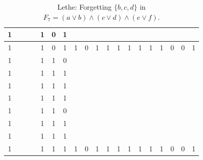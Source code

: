 \begin{table}[!tb]
\begin{tabular}{|c|c|c|c|c|c|c|c|c|c|c|c|c|c|c|c|c|c|c|}
        \rowcolor{blue!40} 1 &  &  &  & 1 & 0 & 1 &  &  &  &  &  &  &  &  &  &  &  &  \\ \hline
        \rowcolor{blue!40} 1 &  &  &  & 1 & 0 & 1 & 1 & 0 & 1 & 1 & 1 & 1 & 1 & 1 & 1 & 0 & 0 & 1 \\ \hline
        \rowcolor{red!40} 1 &  &  &  & 1 & 1 & 0 &  &  &  &  &  &  &  &  &  &  &  &  \\ \hline
        \rowcolor{red!40} 1 &  &  &  & 1 & 1 & 1 &  &  &  &  &  &  &  &  &  &  &  &  \\ \hline
        \rowcolor{red!40} 1 &  &  &  & 1 & 1 & 1 &  &  &  &  &  &  &  &  &  &  &  &  \\ \hline
        \rowcolor{red!40} 1 &  &  &  & 1 & 1 & 1 &  &  &  &  &  &  &  &  &  &  &  &  \\ \hline
        \rowcolor{red!40} 1 &  &  &  & 1 & 1 & 0 &  &  &  &  &  &  &  &  &  &  &  &  \\ \hline
        \rowcolor{red!40} 1 &  &  &  & 1 & 1 & 1 &  &  &  &  &  &  &  &  &  &  &  &  \\ \hline
        \rowcolor{red!40} 1 &  &  &  & 1 & 1 & 1 &  &  &  &  &  &  &  &  &  &  &  &  \\ \hline
        \rowcolor{red!40} 1 &  &  &  & 1 & 1 & 1 & 1 & 0 & 1 & 1 & 1 & 1 & 1 & 1 & 1 & 0 & 0 & 1 \\ \hline
    \end{tabular}
    \caption{Lethe: Forgetting $\{b, c, d\}$ in $F_{7} = (a \lor b) \land (c \lor d) \land (e \lor f)$.}
    \label{tab:lethe-F7-bcd}
\end{table}
